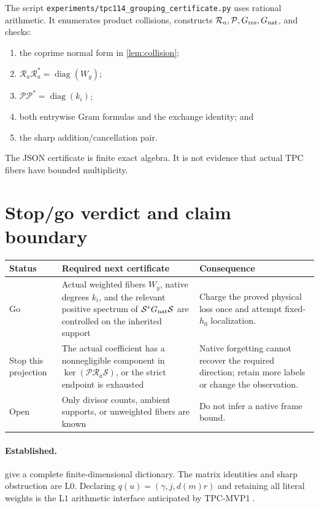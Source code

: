 \documentclass[11pt]{article}
\theoremstyle{definition}
\theoremstyle{remark}
\newcommand{\Lzero}{\mathrm{L0}}
\newcommand{\Lone}{\mathrm{L1}}
\newcommand{\Res}{\mathcal R}
\newcommand{\Nat}{\mathcal P}
\newcommand{\Syn}{\mathcal S}
\begin{document}
The script
\texttt{experiments/tpc114\_grouping\_certificate.py} uses rational
arithmetic.  It enumerates product collisions, constructs
\(\Res_a,\Nat,G_{\rm res},G_{\rm nat}\), and checks:
\begin{enumerate}[leftmargin=2em]
\item the coprime normal form in \cref{lem:collision};
\item \(\Res_a\Res_a^*=\operatorname{diag}(W_y)\);
\item \(\Nat\Nat^*=\operatorname{diag}(k_i)\);
\item both entrywise Gram formulas and the exchange identity; and
\item the sharp addition/cancellation pair.
\end{enumerate}
The JSON certificate is finite exact algebra.  It is not evidence
that actual TPC fibers have bounded multiplicity.

\section{Stop/go verdict and claim boundary}

\begin{center}
\small
\begin{tabularx}{\textwidth}{@{}p{}p{}X@{}}
\toprule
Status & Required next certificate & Consequence\\
\midrule
Go &
Actual weighted fibers \(W_y\), native degrees \(k_i\), and the
relevant positive spectrum of
\(\Syn^*G_{\rm nat}\Syn\) are controlled on the inherited support &
Charge the proved physical loss once and attempt fixed-\(h_0\)
localization.\\
Stop this projection &
The actual coefficient has a nonnegligible component in
\(\ker(\Nat\Res_a\Syn)\), or the strict endpoint is exhausted &
Native forgetting cannot recover the required direction; retain more
labels or change the observation.\\
Open &
Only divisor counts, ambient supports, or unweighted fibers are known &
Do not infer a native frame bound.\\
\bottomrule
\end{tabularx}
\end{center}

\paragraph{Established.}
give a complete finite-dimensional
dictionary.  The matrix identities and sharp obstruction are
\(\Lzero\).  Declaring \(q(u)=(\gamma,j,d(m)r)\) and retaining all
literal weights is the \(\Lone\) arithmetic interface anticipated by
TPC-MVP1 \citep{WangMVP1}.
\end{document}
